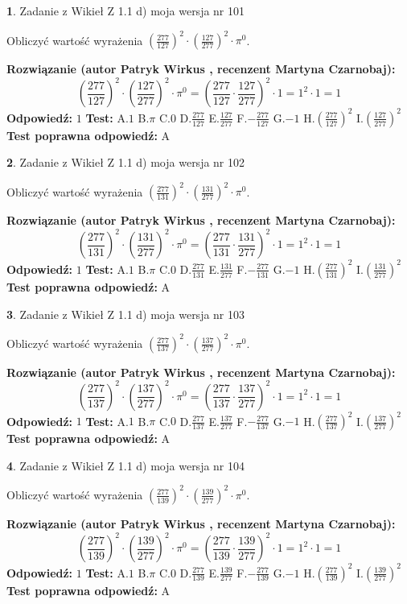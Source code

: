 \documentclass[12pt, a4paper]{article}
\theoremstyle{definition} %
\newtheorem{zad}{}
\newcommand{\zadStart}[1]{\begin{zad}#1\newline}
\newcommand{\zadStop}{\end{zad}}
\newcommand{\rozwStart}[2]{\noindent \textbf{Rozwiązanie (autor #1 , recenzent #2): }\newline}
\newcommand{\rozwStop}{\newline}
\newcommand{\odpStart}{\noindent \textbf{Odpowiedź:}\newline}
\newcommand{\odpStop}{\newline}
\newcommand{\testStart}{\noindent \textbf{Test:}\newline}
\newcommand{\testStop}{\newline}
\newcommand{\kluczStart}{\noindent \textbf{Test poprawna odpowiedź:}\newline}
\newcommand{\kluczStop}{\newline}
\begin{document}
\zadStart{Zadanie z Wikieł Z 1.1 d) moja wersja nr 101}

Obliczyć wartość wyrażenia $(\frac{277}{127})^{2} \cdot (\frac{127}{277})^{2} \cdot \pi^{0}$.
\zadStop
\rozwStart{Patryk Wirkus}{Martyna Czarnobaj}
$$(\frac{277}{127})^{2} \cdot (\frac{127}{277})^{2} \cdot \pi^{0} = (\frac{277}{127} \cdot \frac{127}{277})^{2} \cdot 1 = 1^{2} \cdot 1 = 1$$
\rozwStop
\odpStart
$1$
\odpStop
\testStart
A.$1$ B.$\pi$ C.$0$ D.$\frac{277}{127}$ E.$\frac{127}{277}$
F.$-\frac{277}{127}$ G.$-1$
H.$(\frac{277}{127})^{2}$
I.$(\frac{127}{277})^{2}$
\testStop
\kluczStart
A
\kluczStop



\zadStart{Zadanie z Wikieł Z 1.1 d) moja wersja nr 102}

Obliczyć wartość wyrażenia $(\frac{277}{131})^{2} \cdot (\frac{131}{277})^{2} \cdot \pi^{0}$.
\zadStop
\rozwStart{Patryk Wirkus}{Martyna Czarnobaj}
$$(\frac{277}{131})^{2} \cdot (\frac{131}{277})^{2} \cdot \pi^{0} = (\frac{277}{131} \cdot \frac{131}{277})^{2} \cdot 1 = 1^{2} \cdot 1 = 1$$
\rozwStop
\odpStart
$1$
\odpStop
\testStart
A.$1$ B.$\pi$ C.$0$ D.$\frac{277}{131}$ E.$\frac{131}{277}$
F.$-\frac{277}{131}$ G.$-1$
H.$(\frac{277}{131})^{2}$
I.$(\frac{131}{277})^{2}$
\testStop
\kluczStart
A
\kluczStop



\zadStart{Zadanie z Wikieł Z 1.1 d) moja wersja nr 103}

Obliczyć wartość wyrażenia $(\frac{277}{137})^{2} \cdot (\frac{137}{277})^{2} \cdot \pi^{0}$.
\zadStop
\rozwStart{Patryk Wirkus}{Martyna Czarnobaj}
$$(\frac{277}{137})^{2} \cdot (\frac{137}{277})^{2} \cdot \pi^{0} = (\frac{277}{137} \cdot \frac{137}{277})^{2} \cdot 1 = 1^{2} \cdot 1 = 1$$
\rozwStop
\odpStart
$1$
\odpStop
\testStart
A.$1$ B.$\pi$ C.$0$ D.$\frac{277}{137}$ E.$\frac{137}{277}$
F.$-\frac{277}{137}$ G.$-1$
H.$(\frac{277}{137})^{2}$
I.$(\frac{137}{277})^{2}$
\testStop
\kluczStart
A
\kluczStop



\zadStart{Zadanie z Wikieł Z 1.1 d) moja wersja nr 104}

Obliczyć wartość wyrażenia $(\frac{277}{139})^{2} \cdot (\frac{139}{277})^{2} \cdot \pi^{0}$.
\zadStop
\rozwStart{Patryk Wirkus}{Martyna Czarnobaj}
$$(\frac{277}{139})^{2} \cdot (\frac{139}{277})^{2} \cdot \pi^{0} = (\frac{277}{139} \cdot \frac{139}{277})^{2} \cdot 1 = 1^{2} \cdot 1 = 1$$
\rozwStop
\odpStart
$1$
\odpStop
\testStart
A.$1$ B.$\pi$ C.$0$ D.$\frac{277}{139}$ E.$\frac{139}{277}$
F.$-\frac{277}{139}$ G.$-1$
H.$(\frac{277}{139})^{2}$
I.$(\frac{139}{277})^{2}$
\testStop
\kluczStart
A
\kluczStop
\end{document}
